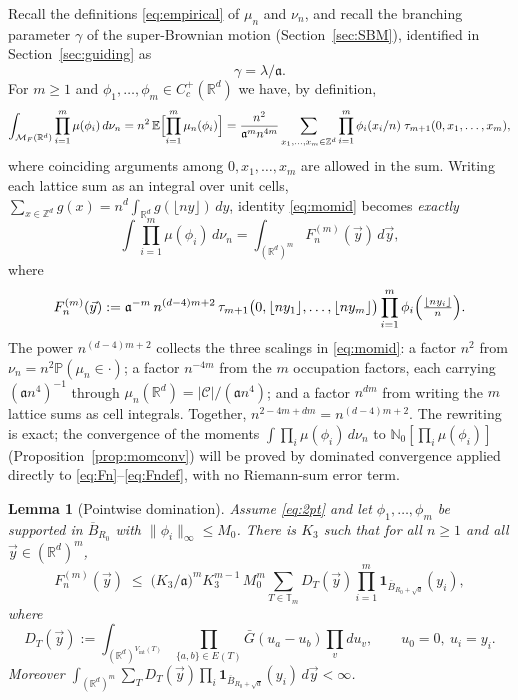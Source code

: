 \documentclass[11pt]{article}
\newtheorem{lemma}[theorem]{Lemma}
\theoremstyle{definition}
\theoremstyle{remark}
\newcommand{\R}{\mathbb{R}}
\newcommand{\Z}{\mathbb{Z}}
\newcommand{\E}{\mathbb{E}}
\newcommand{\bP}{\mathbb{P}}
\newcommand{\bN}{{\mathbb{N}_0}}                 %
\newcommand{\cM}{{\mathcal{M}_F(\R^d)}}          %
\newcommand{\Cc}{C_c^+(\R^d)}
\newcommand{\T}{\mathbb{T}}                    %
\newcommand{\fl}[1]{\lfloor #1\rfloor}
\numberwithin{equation}{section}
\theoremstyle{plain}
\theoremstyle{definition}
\theoremstyle{remark}
\theoremstyle{plain}
\begin{document}
Recall the definitions \eqref{eq:empirical} of $\mu_n$ and $\nu_n$, and recall the branching parameter $\gamma$ of the super-Brownian motion (Section~\ref{sec:SBM}), identified in Section~\ref{sec:guiding} as
\begin{equation}\label{eq:gammadef}
\gamma=\lambda/\mathfrak a .
\end{equation}
For $m\ge1$ and $\phi_1,\dots,\phi_m\in\Cc$ we have, by definition,
\begin{equation}\label{eq:momid}
\int_{\cM}\prod_{i=1}^m\mu(\phi_i)\,d\nu_n
=n^2\,\E\Bigl[\prod_{i=1}^m\mu_n(\phi_i)\Bigr]
=\frac{n^{2}}{\mathfrak a^m n^{4m}}
\sum_{x_1,\dots,x_m\in\Z^d}\prod_{i=1}^m\phi_i(x_i/n)\;
\tau_{m+1}(0,x_1,\dots,x_m),
\end{equation}
where coinciding arguments among $0,x_1,\dots,x_m$ are allowed in the sum. Writing each lattice sum as an integral over unit cells,
$\sum_{x\in\Z^d}g(x)=n^{d}\int_{\R^d}g(\fl{ny})\,dy$, identity
\eqref{eq:momid} becomes \emph{exactly}
\begin{equation}\label{eq:Fn}
\int\prod_{i=1}^m\mu(\phi_i)\,d\nu_n=\int_{(\R^d)^m}F_n^{(m)}(\vec y)\,d\vec y,
\end{equation}
where
\begin{equation}\label{eq:Fndef}
F^{(m)}_n(\vec y):=\mathfrak a^{-m}\,n^{(d-4)m+2}\,
\tau_{m+1}\bigl(0,\fl{ny_1},\dots,\fl{ny_m}\bigr)
\prod_{i=1}^m\phi_i\Bigl(\tfrac{\fl{ny_i}}{n}\Bigr).
\end{equation}
The power $n^{(d-4)m+2}$ collects the three scalings in \eqref{eq:momid}: a factor $n^2$ from $\nu_n=n^2\bP(\mu_n\in\cdot)$; a factor $n^{-4m}$ from the $m$ occupation factors, each carrying $(\mathfrak a n^4)^{-1}$ through $\mu_n(\R^d)=|\mathcal C|/(\mathfrak a n^4)$; and a factor $n^{dm}$ from writing the $m$ lattice sums as cell integrals. Together, $n^{2-4m+dm}=n^{(d-4)m+2}$.
The rewriting is exact; the convergence of the moments $\int\prod_i\mu(\phi_i)\,d\nu_n$ to $\bN[\prod_i\mu(\phi_i)]$ (Proposition~\ref{prop:momconv}) will be proved by dominated
convergence applied directly to \eqref{eq:Fn}--\eqref{eq:Fndef}, with no
Riemann-sum error term.

\begin{lemma}[Pointwise domination]\label{lem:domination}
Assume \eqref{eq:2pt} and let
$\phi_1,\dots,\phi_m$ be supported in $\overline B_{R_0}$ with
$\|\phi_i\|_\infty\le M_0$. There is $K_3$ such that for all
$n\ge1$ and all $\vec y\in(\R^d)^m$,
\begin{equation}\label{eq:dombound}
F^{(m)}_n(\vec y)\;\le\;\bigl(K_3/\mathfrak a\bigr)^{m}K_3^{m-1}\,M_0^m
\sum_{T\in\T_m} D_T(\vec y)\prod_{i=1}^m
\mathbf 1_{\overline B_{R_0+\sqrt d}}(y_i),
\end{equation}
where
\[
D_T(\vec y):=\int_{(\R^d)^{V_{\mathrm{int}}(T)}}
\prod_{\{a,b\}\in E(T)}\bar G(u_a-u_b)
\prod_{v}du_v ,\qquad u_0=0,\ u_i=y_i .
\]
Moreover $\int_{(\R^d)^m}\sum_{T}D_T(\vec y)\prod_i
\mathbf 1_{\overline B_{R_0+\sqrt d}}(y_i)\,d\vec y<\infty$.
\end{lemma}
\end{document}
